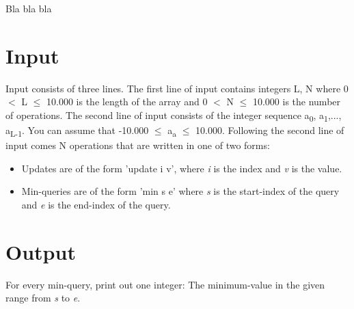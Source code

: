 
Bla bla bla

\section*{Input}
Input consists of three lines. The first line of input contains integers L, N where 0 $<$ L $\leq$ 10.000 is the length of the array and 0 $<$ N $\leq$ 10.000 is the number of operations. The second line of input consists of the integer sequence a\textsubscript{0}, a\textsubscript{1},..., a\textsubscript{L-1}. You can assume that -10.000 $\leq$ a\textsubscript{a} $\leq$ 10.000. Following the second line of input comes N operations that are written in one of two forms:
\begin{itemize}
    \item Updates are of the form 'update i v', where \emph{i} is the index and \emph{v} is the value.
    \item Min-queries are of the form 'min s e' where \emph{s} is the start-index of the query and \emph{e} is the end-index of the query.
\end{itemize}

\section*{Output}
For every min-query, print out one integer: The minimum-value in the given range from \emph{s} to \emph{e}.